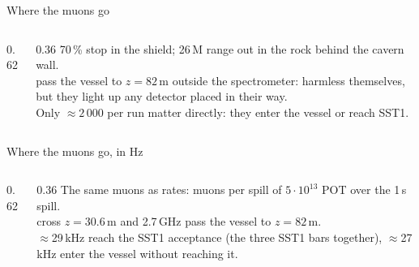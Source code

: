 \documentclass[aspectratio=169,10pt]{beamer}
\begin{document}
\begin{frame}{Where the muons go}
  \begin{columns}[c]
    \begin{column}{0.62\textwidth}
    \end{column}
    \begin{column}{0.36\textwidth}\footnotesize
      70\,\% stop in the shield; 26\,M range out in the rock behind the cavern wall.\\[1.5mm]
       pass the vessel to $z = 82$\,m outside the spectrometer: harmless themselves, but they light up any detector placed in their way.\\[1.5mm]
      Only $\approx2\,000$ per run matter directly: they enter the vessel or reach SST1.\\[1.5mm]
    \end{column}
  \end{columns}
\end{frame}

\begin{frame}{Where the muons go, in Hz}
  \begin{columns}[c]
    \begin{column}{0.62\textwidth}
    \end{column}
    \begin{column}{0.36\textwidth}\footnotesize
      The same muons as rates: muons per spill of $5\cdot10^{13}$ POT over the 1\,s spill.\\[1.5mm]
       cross $z = 30.6$\,m and 2.7\,GHz pass the vessel to $z = 82$\,m.\\[1.5mm]
      $\approx$29\,kHz reach the SST1 acceptance (the three SST1 bars together), $\approx$27\,kHz enter the vessel without reaching it.\\[1.5mm]
    \end{column}
  \end{columns}
\end{frame}
\end{document}
